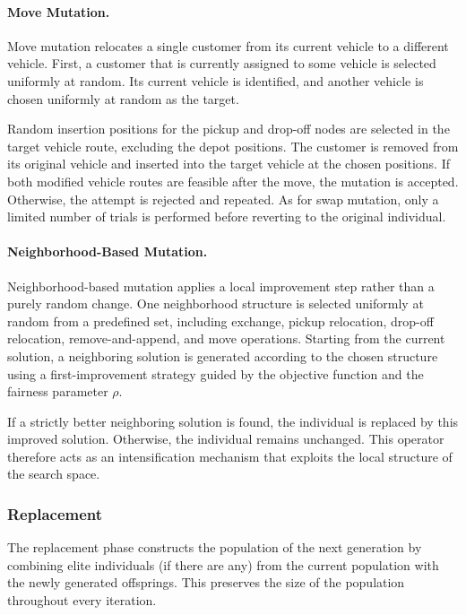 \documentclass[12pt]{article}
\begin{document}
\paragraph{Move Mutation.}
Move mutation relocates a single customer from its current vehicle to a different vehicle. First, a customer that is currently assigned to some vehicle is selected uniformly at random. Its current vehicle is identified, and another vehicle is chosen uniformly at random as the target.

Random insertion positions for the pickup and drop-off nodes are selected in the target vehicle route, excluding the depot positions. The customer is removed from its original vehicle and inserted into the target vehicle at the chosen positions. If both modified vehicle routes are feasible after the move, the mutation is accepted. Otherwise, the attempt is rejected and repeated. As for swap mutation, only a limited number of trials is performed before reverting to the original individual.

\paragraph{Neighborhood-Based Mutation.}
Neighborhood-based mutation applies a local improvement step rather than a purely random change. One neighborhood structure is selected uniformly at random from a predefined set, including exchange, pickup relocation, drop-off relocation, remove-and-append, and move operations. Starting from the current solution, a neighboring solution is generated according to the chosen structure using a first-improvement strategy guided by the objective function and the fairness parameter $\rho$.

If a strictly better neighboring solution is found, the individual is replaced by this improved solution. Otherwise, the individual remains unchanged. This operator therefore acts as an intensification mechanism that exploits the local structure of the search space.

\subsubsection{Replacement}

The replacement phase constructs the population of the next generation by combining elite individuals (if there are any) from the current population with the newly generated offsprings. This preserves the size of the population throughout every iteration.
\end{document}

